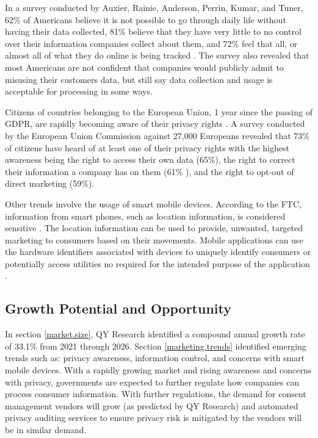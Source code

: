 In a survey conducted by Auxier, Rainie, Anderson, Perrin, Kumar, and Tuner, 62\% of Americans believe it is not possible to go through daily life without having their data collected, 81\% believe that they have very little to no control over their information companies collect about them, and 72\% feel that all, or almost all of what they do online is being tracked \cite{pewresearch.2019}. The survey also revealed that most Americans are not confident that companies would publicly admit to misusing their customers data, but still say data collection and usage is acceptable for processing in some ways.

Citizens of countries belonging to the European Union, 1 year since the passing of GDPR, are rapidly becoming aware of their privacy rights \cite{eucomm.2019}. A survey conducted by the European Union Commission against 27,000 Europeans revealed that 73\% of citizens have heard of at least one of their privacy rights with the highest awareness being the right to access their own data (65\%), the right to correct their information a company has on them (61\% ), and the right to opt-out of direct marketing (59\%).

Other trends involve the usage of smart mobile devices. According to the FTC, information from smart phones, such as location information, is considered sensitive \cite{ftc.mobile.2012}. The location information can be used to provide, unwanted, targeted marketing to consumers based on their movements. Mobile applications can use the hardware identifiers associated with devices to uniquely identify consumers or potentially access utilities no required for the intended purpose of the application \cite{tama.mobile.2012}.

\subsection{Growth Potential and Opportunity}

In section \ref{market.size}, QY Research identified a compound annual growth rate of 33.1\% from 2021 through 2026. Section \ref{marketing.trends} identified emerging trends such as: privacy awareness, information control, and concerns with smart mobile devices. With a rapidly growing market and rising awareness and concerns with privacy, governments are expected to further regulate how companies can process consumer information. With further regulations, the demand for consent management vendors will grow (as predicted by QY Research) and  automated privacy auditing services to ensure privacy risk is mitigated by the vendors will be in similar demand. 

